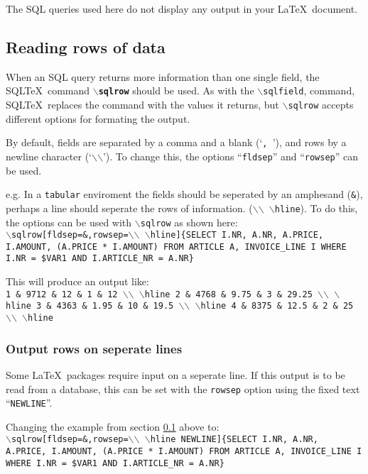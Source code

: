 \documentclass{article}
\newcommand{\bs}{\ensuremath{\backslash}}
\newcommand{\vs}{\vspace{3mm}}
\begin{document}
\vs

The SQL queries used here do not display any output in your \LaTeX\ document.


\subsection{Reading rows of data}\label{sqlrow}

When an SQL query returns more information than one single field, the SQL\TeX\
command \texttt{\textbf{\bs sqlrow}} should be used. As with the \texttt{\bs sqlfield},
command, SQL\TeX\ replaces the command with the values it returns, but \texttt{\bs sqlrow}
accepts different options for formating the output.

\vs

By default, fields are separated by a comma and a blank (`\texttt{,~}'), and rows by 
a newline character (`\texttt{\bs\bs}'). To change this, the options ``\texttt{fldsep}''
and ``\texttt{rowsep}'' can be used.

e.g. In a \texttt{tabular} enviroment the fields should be seperated by an amphesand (\texttt{\&}),
perhaps a line should seperate the rows of information. (\texttt{\bs\bs~\bs hline}).
To do this, the options can be used with \texttt{\bs sqlrow} as shown here: \\
\texttt{\bs sqlrow[fldsep=\&,rowsep=\bs\bs~\bs hline]\{SELECT I.NR, A.NR, 
A.PRICE, I.AMOUNT, (A.PRICE * I.AMOUNT) FROM ARTICLE A, INVOICE\_LINE I WHERE I.NR = \$VAR1 
AND I.ARTICLE\_NR = A.NR\}}

\vs

This will produce an output like: \\
\texttt{1 \& 9712 \& 12 \& 1 \& 12 \bs\bs~\bs hline 
2 \& 4768 \& 9.75 \& 3 \& 29.25 \bs\bs~\bs hline 
3 \& 4363 \& 1.95 \& 10 \& 19.5 \bs\bs~\bs hline 
4 \& 8375 \& 12.5 \& 2 \& 25 \bs\bs~\bs hline}

\subsubsection{Output rows on seperate lines}

Some \LaTeX\ packages require input on a seperate line. If this output is to be
read from a database, this can be set with the \texttt{rowsep} option using the
fixed text ``\texttt{NEWLINE}''.

Changing the example from section \ref{sqlrow} above to:\\
\texttt{\bs sqlrow[fldsep=\&,rowsep=\bs\bs~\bs hline NEWLINE]\{SELECT I.NR, A.NR, 
A.PRICE, I.AMOUNT, (A.PRICE * I.AMOUNT) FROM ARTICLE A, INVOICE\_LINE I WHERE I.NR = \$VAR1 
AND I.ARTICLE\_NR = A.NR\}}
\end{document}
